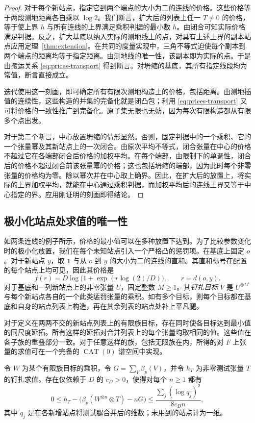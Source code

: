 \begin{proof}
对于每个新站点，指定它到两个端点的大小为二的连线的价格。这些价格等于两段测地距离各自乘以 \(\log 2\)。我们断言，扩大后的列表上任一 \(T\ne0\) 的价格，等于使上界 \(h\) 与所有连线的上界满足乘积判据的最小数 \(h\)。由闭合可知实际价格满足判据。反之，扩大基底以纳入实际的测地线上的点，对具有上述上界的副本站点应用定理~\ref{thm:extension}。在共同的度量实现中，三角不等式迫使每个副本到两个端点的距离均等于指定距离。由测地线的唯一性，该副本即为实际的点。于是由搬运关系 \eqref{eq:prices-transport} 得到断言。对坍缩的基底，其所有指定线段均为常值，断言直接成立。

迭代使用这一刻画，即可确定所有有限次测地构造上的价格，包括距离。由测地插值的连续性，这些构造的并集的完备化就是闭凸包；利用 \eqref{eq:prices-transport} 又可将价格的一致性推广到完备化。原子集无限也无妨，因为每次有限构造都从有限多个点出发。

对于第二个断言，中心放置坍缩的情形显然。否则，固定判据中的一个乘积、它的一个张量幂及其新站点上的一次闭合。由原次平均不等式，闭合张量在中心的价格不超过它在各端部闭合后价格的加权平均。在每个端部，由限制下的单调性，闭合后的价格不超过闭合前该张量幂的价格；这也包括坍缩的端部，因为此时每个非零张量的价格均为零。除以幂次并在中心取上确界。因此，在扩大后的放置上，将实际的上界加权平均，就能在中心通过乘积判据，而加权平均后的连线上界又等于中心指定的界。应用刚证明的刻画即得结论。
\end{proof}

\subsection{极小化站点处求值的唯一性}
如两条连线的例子所示，价格的最小值可以在多种放置下达到。为了比较参数变化时的极小化放置，我们在每个未知站点引入一个严格凸的惩罚项。在基底上固定 \(o\)。对于新站点 \(y\)，取 \(\mathbf1\) 与从 \(o\) 到 \(y\) 的大小为二的连线的直和。其直和标号在配置的每个站点上均可见，因此其价格是
\[
 f(r)=D\log\bigl(1+\exp(r\log(2)/D)\bigr),\qquad r=d(o,y).
\]
对于基底和一列新站点上的非零张量 \(U\)，固定整数 \(M\ge1\)。其\emph{钉扎目标} \(V\) 是 \(U^{\otimes M}\) 与每个新站点各自的一个此类惩罚张量的乘积。如有多个目标，则每个目标都在基底和自身的站点列表上构造，再在其余列表的站点处补上平凡腿。

\begin{lemma}[钉扎求值]\label{lem:pinning}
对于定义在两两不交的新站点列表上的有限族目标，存在同时使各目标达到最小值的同尺度延拓。所有这样的延拓对合并列表上的每个张量均取相同的值。这些值在各子族的重叠部分一致。对于任意这样的族，包括无限族在内，所得的对 \(F\) 上张量的求值可在一个完备的 \(\operatorname{CAT}(0)\) 谱空间中实现。

令 \(W\) 为某个有限族目标的乘积，令 \(G=\sum_V\beta_p(V)\)，并令 \(h_T\) 为非零测试张量 \(T\) 的钉扎求值。存在仅依赖于 \(D\) 的 \(c_D>0\)，使得对每个 \(n\ge1\) 都有
\begin{equation}\label{eq:prices-pin-limit}
 0\le h_T-\bigl(\beta_p(W^{\otimes n}\otimes T)-nG\bigr)
 \le\frac{\sum_j(\log q_j)^2}{8c_D n},
\end{equation}
其中 \(q_j\) 是在各新增站点将测试腿合并后的维数；未用到的站点计为一维。
\end{lemma}

